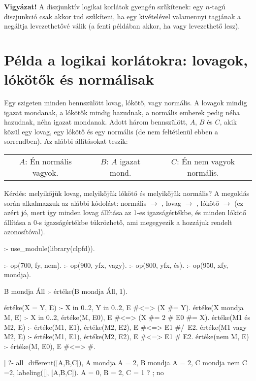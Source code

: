 {\bf Vigyázat!} A diszjunktív logikai korlátok gyengén szűkítenek: egy $n$-tagú
diszjunkció csak akkor tud szűkíteni, ha egy kivételével valamennyi tagjának a
negáltja levezethetővé válik (a fenti példában akkor, ha  vagy 
levezethető lesz).

\section{Példa a logikai korlátokra: lovagok, lókötők és normálisak}

Egy szigeten minden bennszülött lovag, lókötő, vagy normális. A lovagok mindig
igazat mondanak, a lókötők mindig hazudnak, a normális emberek pedig néha
hazudnak, néha igazat mondanak. Adott három bennszülött, $A$, $B$ és $C$, akik
közül egy lovag, egy lókötő és egy normális (de nem feltétlenül ebben a sorrendben).
Az alábbi állításokat teszik:

\begin{center}\begin{tabular}{ccc}
$A$: Én normális vagyok. & $B$: $A$ igazat mond. & $C$: Én nem vagyok normális.
\end{tabular}\end{center}

Kérdés: melyikőjük lovag, melyikőjük lókötő és melyikőjük normális?
\br
A \clpfd megoldás során alkalmazzuk az alábbi kódolást: normális $\to$ ,
lovag $\to$ , lókötő $\to$  (ez azért jó, mert így minden lovag
állítása az 1-es igazságértékbe, és minden lókötő állítása a 0-s igazságértékbe
tükrözhető, ami megegyezik a hozzájuk rendelt azonosítóval).

\begin{prologcode}
:- use_module(library(clpfd)).

:- op(700, fy, nem).     :- op(900, yfx, vagy).
:- op(800, yfx, és).     :- op(950, xfy, mondja).

B mondja Áll :- értéke(B mondja Áll, 1).

értéke(X = Y, E) :-
    X in 0..2, Y in 0..2, E #<=> (X #= Y).
értéke(X mondja M, E) :-
    X in 0..2, értéke(M, E0),
    E #<=> (X #= 2 #\/ E0 #= X).
értéke(M1 és M2, E) :-
    értéke(M1, E1), értéke(M2, E2), E #<=> E1 #/\ E2.
értéke(M1 vagy M2, E) :-
    értéke(M1, E1), értéke(M2, E2), E #<=> E1 #\/ E2.
értéke(nem M, E) :-
        értéke(M, E0), E #<=> #.

| ?- all_different([A,B,C]), A mondja A = 2,
     B mondja A = 2, C mondja nem C =2,
     labeling([], [A,B,C]).
A = 0, B = 2, C = 1 ? ;
no
\end{prologcode}

